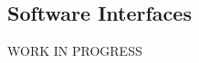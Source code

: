 \documentclass[../../../rasd.tex]{subfiles}
\begin{document}
\subsection{Software Interfaces}
			WORK IN PROGRESS
\end{document}
